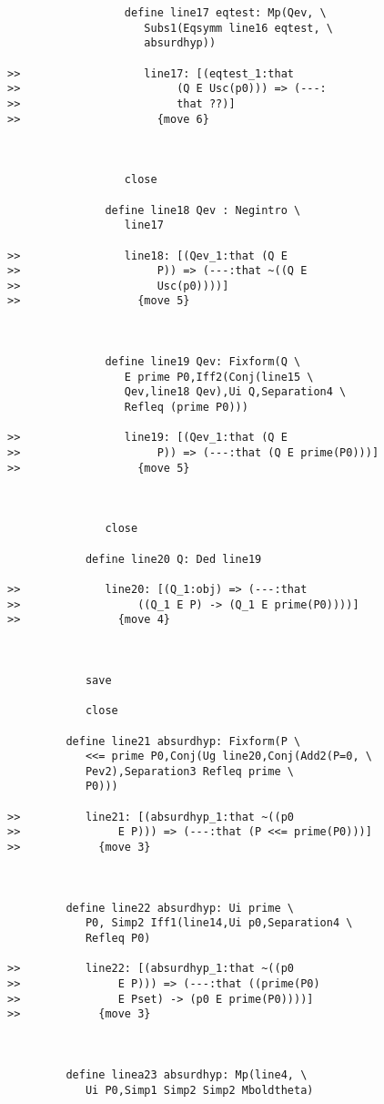 \documentclass[12pt]{article}
\begin{document}
\begin{verbatim}
                  define line17 eqtest: Mp(Qev, \
                     Subs1(Eqsymm line16 eqtest, \
                     absurdhyp))

>>                   line17: [(eqtest_1:that
>>                        (Q E Usc(p0))) => (---:
>>                        that ??)]
>>                     {move 6}



                  close

               define line18 Qev : Negintro \
                  line17

>>                line18: [(Qev_1:that (Q E
>>                     P)) => (---:that ~((Q E
>>                     Usc(p0))))]
>>                  {move 5}



               define line19 Qev: Fixform(Q \
                  E prime P0,Iff2(Conj(line15 \
                  Qev,line18 Qev),Ui Q,Separation4 \
                  Refleq (prime P0)))

>>                line19: [(Qev_1:that (Q E
>>                     P)) => (---:that (Q E prime(P0)))]
>>                  {move 5}



               close

            define line20 Q: Ded line19

>>             line20: [(Q_1:obj) => (---:that
>>                  ((Q_1 E P) -> (Q_1 E prime(P0))))]
>>               {move 4}



            save

            close

         define line21 absurdhyp: Fixform(P \
            <<= prime P0,Conj(Ug line20,Conj(Add2(P=0, \
            Pev2),Separation3 Refleq prime \
            P0)))

>>          line21: [(absurdhyp_1:that ~((p0
>>               E P))) => (---:that (P <<= prime(P0)))]
>>            {move 3}



         define line22 absurdhyp: Ui prime \
            P0, Simp2 Iff1(line14,Ui p0,Separation4 \
            Refleq P0)

>>          line22: [(absurdhyp_1:that ~((p0
>>               E P))) => (---:that ((prime(P0)
>>               E Pset) -> (p0 E prime(P0))))]
>>            {move 3}



         define linea23 absurdhyp: Mp(line4, \
            Ui P0,Simp1 Simp2 Simp2 Mboldtheta)



\end{verbatim}
\end{document}
